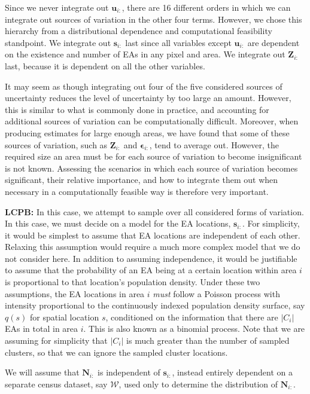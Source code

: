 \documentclass[12pt]{article}
\begin{document}
Since we never integrate out $\boldsymbol{u}_{i:}$, there are 16 different orders in which we can integrate out sources of variation in the other four terms. However, we chose this hierarchy from a distributional dependence and computational feasibility standpoint. We integrate out $\boldsymbol{s}_{i:}$ last since all variables except $\boldsymbol{u}_{i:}$ are dependent on the existence and number of EAs in any pixel and area. We integrate out $\boldsymbol{Z}_{i:}$ last, because it is dependent on all the other variables.

It may seem as though integrating out four of the five considered sources of uncertainty reduces the level of uncertainty by too large an amount. However, this is similar to what is commonly done in practice, and accounting for additional sources of variation can be computationally difficult.  Moreover, when producing estimates for large enough areas, we have found that some of these sources of variation, such as $\boldsymbol{Z}_{i:}$ and $\boldsymbol{ \epsilon}_{i:}$, tend to average out.  However, the required size an area must be for each source of variation to become insignificant is not known.  Assessing the scenarios in which each source of variation becomes significant, their relative importance, and how to integrate them out when necessary in a computationally feasible way is therefore very important.

\medskip
\noindent
\textbf{LCPB:} In this case, we attempt to sample over all considered forms of variation. In this case, we must decide on a model for the EA locations, $\boldsymbol{s}_{i:}$. For simplicity, it would be simplest to assume that EA locations are independent of each other. Relaxing this assumption would require a much more complex model that we do not consider here. In addition to assuming independence, it would be justifiable to assume that the probability of an EA being at a certain location within area $i$ is proportional to that location's population density. Under these two assumptions, the EA locations in area $i$ \textit{must} follow a Poisson process with intensity proportional to the continuously indexed population density surface, say $q(s)$ for spatial location $s$, conditioned on the information that there are $|C_i|$ EAs in total in area $i$. This is also known as a binomial process. Note that we are assuming for simplicity that $|C_i|$ is much greater than the number of sampled clusters, so that we can ignore the sampled cluster locations.

We will assume that $\boldsymbol{N}_{i:}$ is independent of $\mathbf{s}_{i:}$, instead entirely dependent on a separate census dataset, say $\mathscr{W}$, used only to determine the distribution of $\boldsymbol{N}_{i:}$.
\end{document}

